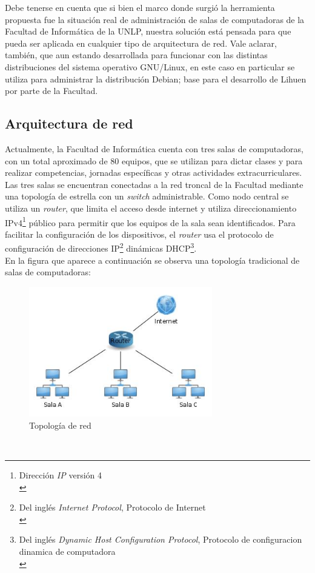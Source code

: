\documentclass[a4paper,12pt]{article}
\begin{document}
Debe tenerse en cuenta que si bien el marco donde surgió la herramienta propuesta fue la situación real de administración de salas de computadoras de la Facultad de Informática de la UNLP, nuestra solución está pensada para que pueda ser aplicada en cualquier tipo de arquitectura de red. Vale aclarar, también, que aun estando desarrollada para funcionar con las distintas distribuciones del sistema operativo GNU/Linux, en este caso en particular se utiliza para administrar la distribución Debian; base para el desarrollo de Lihuen\cite{Lihuen} por parte de la Facultad.\\

\subsection{Arquitectura de red}
\label{sec:orgheadline5}

Actualmente, la Facultad de Informática cuenta con tres salas de computadoras, con un total aproximado de 80 equipos, que se utilizan para dictar clases y para realizar competencias, jornadas específicas y otras actividades extracurriculares. Las tres salas se encuentran conectadas a la red troncal de la Facultad mediante una topología de estrella con un \emph{switch} administrable. Como nodo central se utiliza un \emph{router}, que limita el acceso desde internet y utiliza direccionamiento IPv4\footnote{Dirección \emph{IP} versión 4\\} público para permitir que los equipos de la sala sean identificados. Para facilitar la configuración de los dispositivos, el \emph{router} usa el protocolo de configuración de direcciones IP\footnote{Del inglés \emph{Internet Protocol}, Protocolo de Internet\\} dinámicas DHCP\footnote{Del inglés \emph{Dynamic Host Configuration Protocol}, Protocolo de configuracion dinamica de computadora\\}.\\

En la figura que aparece a continuación se observa una topología tradicional de salas de computadoras:\\

\begin{figure}[htb]
\centering
\includegraphics[width=8cm]{./img/red.jpg}
\caption{Topología de red}
\end{figure}\\
\end{document}
